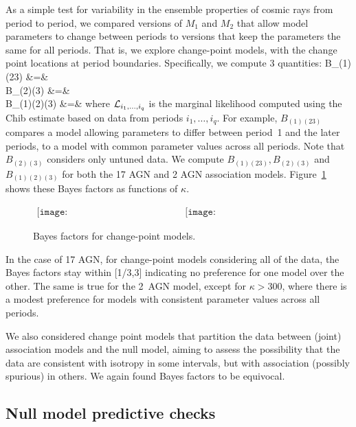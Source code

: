 As a simple test for variability in the ensemble properties of cosmic rays
from period to period, we compared versions of $M_1$ and $M_2$ that allow
model parameters to change between periods to versions that keep the
parameters the same for all periods.  That is, we
explore change-point models, with the change point locations at period
boundaries.  Specifically, we compute 3 quantities:
\ba
B_{(1)(23)} &=& \nonumber\\
B_{(2)(3)} &=& \nonumber\\
B_{(1)(2)(3)} &=& 
\ea
where ${\cal L}_{i_1,\ldots,i_q}$ is the marginal likelihood computed using
the Chib estimate based on data from periods $i_1,\ldots,i_q$.
For example, $B_{(1)(23)}$ compares a model allowing parameters to differ
between period~1 and the later periods, to a model with common parameter
values across all periods.  Note that $B_{(2)(3)}$ considers only untuned
data.  We compute $B_{(1)(23)}, B_{(2)(3)}$ and $B_{(1)(2)(3)}$ for both the
17 AGN and 2 AGN association models. Figure~\ref{fig:changepoint} shows
these Bayes factors as functions of $\kappa$.

\begin{figure}
\centerline{$
\begin{array}{cc}
\texttt{[image: BF\_changepoint\_17AGNs.eps]} &
\texttt{[image: BF\_changepoint\_2AGNs.eps]}
\end{array}$}
\caption{Bayes factors for change-point models.}
\label{fig:changepoint}
\end{figure}

In the case of 17 AGN, for change-point models considering all of the data,
the Bayes factors stay within [1/3,3] indicating no preference for one model
over the other.
The same is true for the 2~AGN model, except for
$\kappa > 300$, where there is a modest preference for models with
consistent parameter values across all periods.

We also considered change point models that partition the data between
(joint) association models and the null model, aiming to assess the
possibility that the data are consistent with isotropy in some intervals,
but with association (possibly spurious) in others.  We again found
Bayes factors to be equivocal.  

\subsection{Null model predictive checks}

